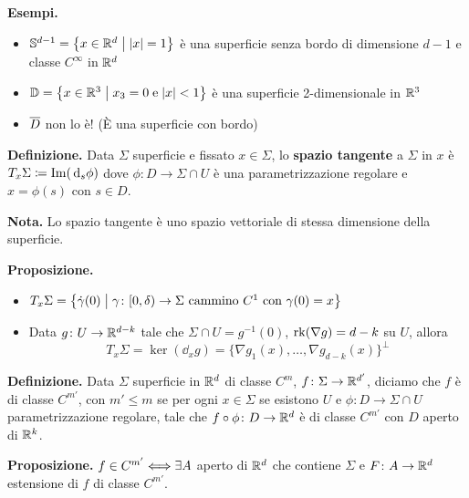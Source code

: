 \newpage

\textbf{Esempi.}
\begin{itemize}

	\item $\mathbb{S}^{d-1} = \left\{ x \in \mathbb R^d \;\middle|\; |x| = 1 \right\}$ è una superficie senza bordo di dimensione $d-1$ e classe $C^\infty$ in $\mathbb R^d$


	\item $\mathbb{D} = \left\{ x \in \mathbb R^3 \;\middle|\; x_3 = 0 \; \text{e} \; |x| < 1 \right\}$ è una superficie 2-dimensionale in $\mathbb R^3$


	\item $\overline{D}$ non lo è! (È una superficie con bordo)

\end{itemize}


\textbf{Definizione.} Data $\Sigma$ superficie e fissato $x \in \Sigma$, lo \textbf{spazio tangente} a $\Sigma$ in $x$ è $ T_x \Sigma \coloneqq \operatorname{Im} (\,\mathrm{d}_s \phi)$ dove $\phi \colon D \to \Sigma \cap U$ è una parametrizzazione regolare e $x = \phi(s)$ con $s \in D$.

\textbf{Nota.} Lo spazio tangente è uno spazio vettoriale di stessa dimensione della superficie.

\textbf{Proposizione.} 
\begin{itemize}

	\item $T_x \Sigma = \left\{ \dot \gamma(0) \;\middle|\; \gamma \colon [0,\delta) \to \Sigma \text{ cammino } C^1 \text{ con } \gamma(0) = x \right\}$ 


	\item Data $g \colon U \to \mathbb R^{d-k}$ tale che $\Sigma \cap U = g^{-1}(0)$, $\operatorname{rk}(\nabla g) = d-k$ su $U$, allora 
	$$
		T_x \Sigma = \ker(\dd_x g) = \{\nabla g_1(x),\ldots, \nabla g_{d-k}(x) \}^\perp
	$$
	
\end{itemize}


\textbf{Definizione.} Data $\Sigma$ superficie in $\mathbb R^d$ di classe $C^m$, $f \colon \Sigma \to \mathbb R^{d'}$, diciamo che $f$ è di classe $C^{m'}$, con $m' \leq m$ se per ogni $x \in \Sigma$ se esistono $U$ e $\phi \colon D \to \Sigma \cap U$ parametrizzazione regolare, tale che $f \circ \phi \colon D \to \mathbb R^d$ è di classe $C^{m'}$ con $D$ aperto di $\mathbb R^k$.


\textbf{Proposizione.} $f \in C^{m'} \Longleftrightarrow \exists A$ aperto di $\mathbb R^d$ che contiene $\Sigma$ e $F \colon A \to \mathbb R^d$ estensione di $f$ di classe $C^{m'}$.

